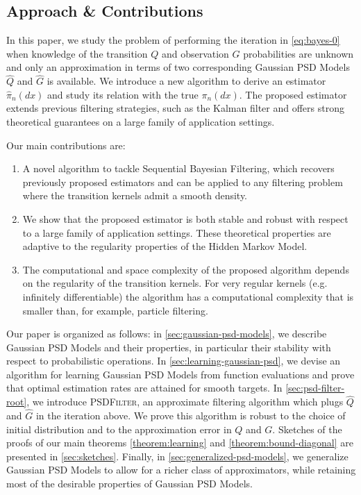 \subsection*{Approach \& Contributions}

In this paper, we study the problem of performing the iteration in \cref{eq:bayes-0} when knowledge of the transition $Q$ and observation $G$ probabilities are unknown and only an approximation in terms of two corresponding Gaussian PSD Models $\hat Q$ and $\hat G$ is available. We introduce a new algorithm to derive an estimator $\hat \pi_n(dx)$ and study its relation with the true $\pi_n(dx)$. The proposed estimator extends previous filtering strategies, such as the Kalman filter and offers strong theoretical guarantees on a large family of application settings.

Our main contributions are:
\begin{enumerate}
    \item A novel algorithm to tackle Sequential Bayesian Filtering, which recovers previously proposed estimators and can be applied to any filtering problem where the transition kernels admit a smooth density.

    \item We show that the proposed estimator is both stable and robust with respect to a large family of application settings. These theoretical properties are adaptive to the regularity properties of the Hidden Markov Model.

    \item The computational and space complexity of the proposed algorithm depends on the regularity of the transition kernels. For very regular kernels (e.g. infinitely differentiable) the algorithm has a computational complexity that is smaller than, for example, particle filtering.

\end{enumerate}

Our paper is organized as follows: in \cref{sec:gaussian-psd-models}, we describe Gaussian PSD Models and their properties, in particular their stability with respect to probabilistic operations. In \cref{sec:learning-gaussian-psd}, we devise an algorithm for learning Gaussian PSD Models from function evaluations and prove that optimal estimation rates are attained for smooth targets. In \cref{sec:psd-filter-root}, we introduce \textsc{PSDFilter}, an approximate filtering algorithm which plugs $\hat Q$ and $\hat G$ in the iteration above. We prove this algorithm is robust to the choice of initial distribution and to the approximation error in $Q$ and $G$. Sketches of the proofs of our main theorems \cref{theorem:learning} and \cref{theorem:bound-diagonal} are presented in \cref{sec:sketches}. Finally, in \cref{sec:generalized-psd-models}, we generalize Gaussian PSD Models to allow for a richer class of approximators, while retaining most of the desirable properties of Gaussian PSD Models.

